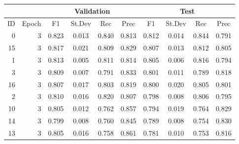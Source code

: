 \begin{tabular}{rr|cccc|cccc}
  \hline
          &        &             \multicolumn{4}{c|}{Validation}   & \multicolumn{4}{c}{Test} \\
  \hline
       ID &  Epoch &       F1 &      St.Dev &      Rec &      Prec &       F1 &       St.Dev &  Rec      &       Prec \\
  \hline
  0 &      3 &     0.823 &          0.013 &    0.840 &     0.813 &    0.812 &           0.014 &     0.844 &      0.791 \\
 15 &      3 &     0.817 &          0.021 &    0.809 &     0.829 &    0.807 &           0.013 &     0.812 &      0.805 \\
  1 &      3 &     0.813 &          0.005 &    0.811 &     0.814 &    0.805 &           0.006 &     0.816 &      0.794 \\
  3 &      3 &     0.809 &          0.007 &    0.791 &     0.833 &    0.801 &           0.011 &     0.789 &      0.818 \\
 16 &      3 &     0.807 &          0.017 &    0.803 &     0.819 &    0.800 &           0.020 &     0.805 &      0.801 \\
  2 &      3 &     0.810 &          0.016 &    0.820 &     0.807 &    0.798 &           0.008 &     0.806 &      0.795 \\
 10 &      3 &     0.805 &          0.012 &    0.762 &     0.857 &    0.794 &           0.019 &     0.764 &      0.829 \\
 14 &      3 &     0.799 &          0.008 &    0.760 &     0.845 &    0.789 &           0.008 &     0.754 &      0.830 \\
 13 &      3 &     0.805 &          0.016 &    0.758 &     0.861 &    0.781 &           0.010 &     0.753 &      0.816 \\
  \hline
\end{tabular}

